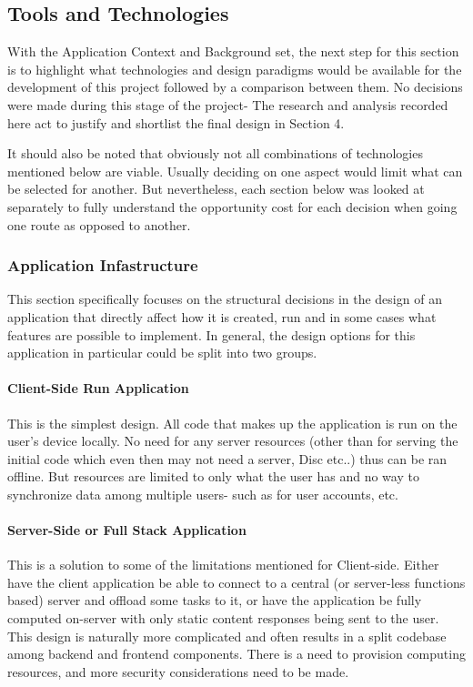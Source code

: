 \subsection{Tools and Technologies} \label{toolsntech}
With the Application Context and Background set, the next step for this section is to highlight what technologies and design paradigms would be available for the development of this project followed by a comparison between them. No decisions were made during this stage of the project- The research and analysis recorded here act to justify and shortlist the final design in Section 4.

It should also be noted that obviously not all combinations of technologies mentioned below are viable. Usually deciding on one aspect would limit what can be selected for another. But nevertheless, each section below was looked at separately to fully understand the opportunity cost for each decision when going one route as opposed to another.

\subsubsection{Application Infastructure}
This section specifically focuses on the structural decisions in the design of an application that directly affect how it is created, run and in some cases what features are possible to implement. In general, the design options for this application in particular could be split into two groups.

\paragraph{Client-Side Run Application}
This is the simplest design. All code that makes up the application is run on the user’s device locally. No need for any server resources (other than for serving the initial code which even then may not need a server, Disc etc..) thus can be ran offline. But resources are limited to only what the user has and no way to synchronize data among multiple users- such as for user accounts, etc.

\paragraph{Server-Side or Full Stack Application}
This is a solution to some of the limitations mentioned for Client-side. Either have the client application be able to connect to a central (or server-less functions based) server and offload some tasks to it, or have the application be fully computed on-server with only static content responses being sent to the user. This design is naturally more complicated and often results in a split codebase among backend and frontend components. There is a need to provision computing resources, and more security considerations need to be made.

